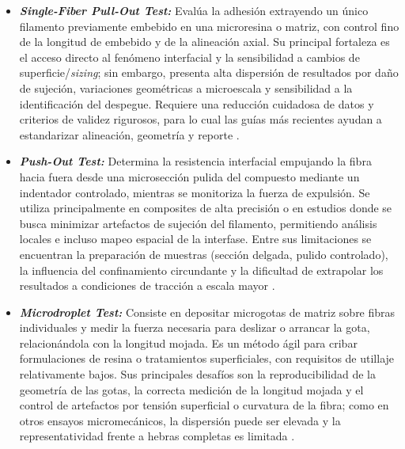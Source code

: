 \begin{itemize}
    \item \textbf{\textit{Single-Fiber Pull-Out Test:}} Evalúa la adhesión extrayendo un único filamento
    previamente embebido en una microresina o matriz, con control fino de la longitud de embebido y de
    la alineación axial. Su principal fortaleza es el acceso directo al fenómeno interfacial y la
    sensibilidad a cambios de superficie/\textit{sizing}; sin embargo, presenta alta dispersión de
    resultados por daño de sujeción, variaciones geométricas a microescala y sensibilidad a la
    identificación del despegue. Requiere una reducción cuidadosa de datos y criterios de validez
    rigurosos, para lo cual las guías más recientes ayudan a estandarizar alineación, geometría y
    reporte \cite{Miller1987,ISO19375,DINSPEC19289}.

    \item \textbf{\textit{Push-Out Test:}} Determina la resistencia interfacial empujando la fibra hacia
    fuera desde una microsección pulida del compuesto mediante un indentador controlado, mientras se
    monitoriza la fuerza de expulsión. Se utiliza principalmente en composites de alta precisión o en
    estudios donde se busca minimizar artefactos de sujeción del filamento, permitiendo análisis
    locales e incluso mapeo espacial de la interfase. Entre sus limitaciones se encuentran la
    preparación de muestras (sección delgada, pulido controlado), la influencia del confinamiento
    circundante y la dificultad de extrapolar los resultados a condiciones de tracción a escala mayor
    \cite{Ouyang2020}.

    \item \textbf{\textit{Microdroplet Test:}} Consiste en depositar microgotas de matriz sobre fibras
    individuales y medir la fuerza necesaria para deslizar o arrancar la gota, relacionándola con la
    longitud mojada. Es un método ágil para cribar formulaciones de resina o tratamientos
    superficiales, con requisitos de utillaje relativamente bajos. Sus principales desafíos son la
    reproducibilidad de la geometría de las gotas, la correcta medición de la longitud mojada y el
    control de artefactos por tensión superficial o curvatura de la fibra; como en otros ensayos
    micromecánicos, la dispersión puede ser elevada y la representatividad frente a hebras completas
    es limitada \cite{Gao2015,Ouyang2020}.


\end{itemize}
